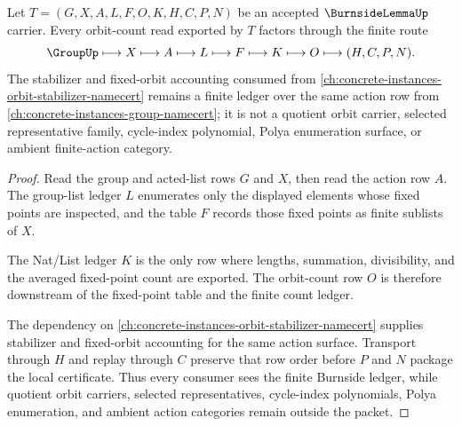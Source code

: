 \begin{theorem}
\label{thm:burnside-lemma-orbit-count-route}
Let $T=(G,X,A,L,F,O,K,H,C,P,N)$ be an accepted $\BurnsideLemmaUp$ carrier. Every orbit-count read exported by $T$ factors through the finite route
$$
\GroupUp \longmapsto X \longmapsto A \longmapsto L \longmapsto F \longmapsto K \longmapsto O \longmapsto (H,C,P,N).
$$
The stabilizer and fixed-orbit accounting consumed from \autoref{ch:concrete-instances-orbit-stabilizer-namecert} remains a finite ledger over the same action row from \autoref{ch:concrete-instances-group-namecert}; it is not a quotient orbit carrier, selected representative family, cycle-index polynomial, Polya enumeration surface, or ambient finite-action category.
\end{theorem}
\begin{proof}
Read the group and acted-list rows $G$ and $X$, then read the action row $A$. The group-list ledger $L$ enumerates only the displayed elements whose fixed points are inspected, and the table $F$ records those fixed points as finite sublists of $X$.

The Nat/List ledger $K$ is the only row where lengths, summation, divisibility, and the averaged fixed-point count are exported. The orbit-count row $O$ is therefore downstream of the fixed-point table and the finite count ledger.

The dependency on \autoref{ch:concrete-instances-orbit-stabilizer-namecert} supplies stabilizer and fixed-orbit accounting for the same action surface. Transport through $H$ and replay through $C$ preserve that row order before $P$ and $N$ package the local certificate. Thus every consumer sees the finite Burnside ledger, while quotient orbit carriers, selected representatives, cycle-index polynomials, Polya enumeration, and ambient action categories remain outside the packet.
\end{proof}



